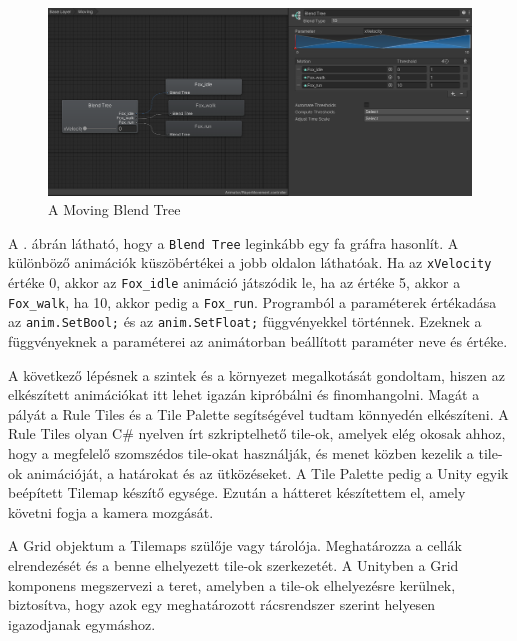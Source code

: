 \begin{figure}[ht]
\centering
\includegraphics[scale = 0.45]{images/blendtree.png}
\caption{A Moving Blend Tree}
\label{fig:blendtree}
\end{figure}

A . ábrán látható, hogy a \texttt{Blend Tree} leginkább egy fa gráfra hasonlít. A különböző animációk küszöbértékei a jobb oldalon láthatóak. Ha az \texttt{xVelocity} értéke 0, akkor az \texttt{Fox\_idle} animáció játszódik le, ha az értéke 5, akkor a \texttt{Fox\_walk}, ha 10, akkor pedig a \texttt{Fox\_run}. Programból a paraméterek értékadása az \texttt{anim.SetBool;} és az \texttt{anim.SetFloat;} függvényekkel történnek. Ezeknek a függvényeknek a paraméterei az animátorban beállított paraméter neve és értéke.


A következő lépésnek a szintek és a környezet megalkotását gondoltam, hiszen az elkészített animációkat itt lehet igazán kipróbálni és finomhangolni. Magát a pályát a Rule Tiles és a Tile Palette segítségével tudtam könnyedén elkészíteni. A Rule Tiles olyan C\# nyelven írt szkriptelhető tile-ok, amelyek elég okosak ahhoz, hogy a megfelelő szomszédos tile-okat használják, és menet közben kezelik a tile-ok animációját, a határokat és az ütközéseket. A Tile Palette pedig a Unity egyik beépített Tilemap készítő egysége. Ezután a hátteret készítettem el, amely követni fogja a kamera mozgását.


A Grid objektum a Tilemaps szülője vagy tárolója. Meghatározza a cellák elrendezését és a benne elhelyezett tile-ok szerkezetét. A Unityben a Grid komponens megszervezi a teret, amelyben a tile-ok elhelyezésre kerülnek, biztosítva, hogy azok egy meghatározott rácsrendszer szerint helyesen igazodjanak egymáshoz. \cite{unitytilemap}

